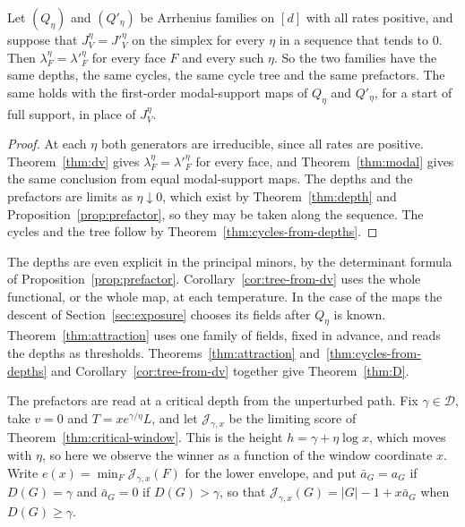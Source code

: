 \begin{corollary}\label{cor:tree-from-dv}
Let $(Q_\eta)$ and $(Q'_\eta)$ be Arrhenius families on $[d]$ with all rates
positive, and suppose that $J^\eta_V=J'^\eta_V$ on the simplex for every $\eta$
in a sequence that tends to $0$. Then $\lambda^\eta_F=\lambda'^\eta_F$ for every
face $F$ and every such $\eta$. So the two families have the same depths, the
same cycles, the same cycle tree and the same prefactors. The same holds with the
first-order modal-support maps of $Q_\eta$ and $Q'_\eta$, for a start of full
support, in place of $J^\eta_V$.
\end{corollary}

\begin{proof}
At each $\eta$ both generators are irreducible, since all rates are positive.
Theorem~\ref{thm:dv} gives $\lambda^\eta_F=\lambda'^\eta_F$ for every face, and
Theorem~\ref{thm:modal} gives the same conclusion from equal modal-support maps.
The depths and the prefactors are limits as $\eta\downarrow0$, which exist by
Theorem~\ref{thm:depth} and Proposition~\ref{prop:prefactor}, so they may be
taken along the sequence. The cycles and the tree follow by
Theorem~\ref{thm:cycles-from-depths}.
\end{proof}

The depths are even explicit in the principal minors, by the determinant formula
of Proposition~\ref{prop:prefactor}. Corollary~\ref{cor:tree-from-dv} uses the
whole functional, or the whole map, at each temperature. In the case of the maps
the descent of Section~\ref{sec:exposure} chooses its fields after $Q_\eta$ is
known. Theorem~\ref{thm:attraction} uses one family of fields, fixed in advance,
and reads the depths as thresholds. Theorems~\ref{thm:attraction}
and~\ref{thm:cycles-from-depths} and Corollary~\ref{cor:tree-from-dv} together
give Theorem~\ref{thm:D}.

The prefactors are read at a critical depth from the unperturbed path. Fix
$\gamma\in\mathcal D$, take $v=0$ and $T=xe^{\gamma/\eta}L$, and let
$\mathcal J_{\gamma,x}$ be the limiting score of Theorem~\ref{thm:critical-window}. This
is the height $h=\gamma+\eta\log x$, which moves with $\eta$, so here we
observe the winner as a function of the window coordinate $x$. Write
$e(x)=\min_F\mathcal J_{\gamma,x}(F)$ for the lower envelope, and put $\bar a_G=a_G$ if
$D(G)=\gamma$ and $\bar a_G=0$ if $D(G)>\gamma$, so that
$\mathcal J_{\gamma,x}(G)=|G|-1+x\bar a_G$ when $D(G)\ge\gamma$.

